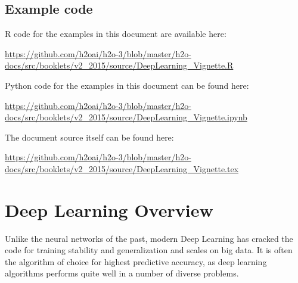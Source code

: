 \newcommand{\waterVersion}{3.0.1.4}


\subsection{Example code}

R code for the examples in this document are available here:

\url{https://github.com/h2oai/h2o-3/blob/master/h2o-docs/src/booklets/v2_2015/source/DeepLearning_Vignette.R}

Python code for the examples in this document can be found here:

\url{https://github.com/h2oai/h2o-3/blob/master/h2o-docs/src/booklets/v2_2015/source/DeepLearning_Vignette.ipynb}

The document source itself can be found here:

\url{https://github.com/h2oai/h2o-3/blob/master/h2o-docs/src/booklets/v2_2015/source/DeepLearning_Vignette.tex}


\newpage
\section{Deep Learning Overview}
Unlike the neural networks of the past, modern Deep Learning has cracked the code for training stability and generalization and scales on big data.  It is often the algorithm of choice for highest predictive accuracy, as deep learning algorithms performs quite well in a number of diverse problems. 

